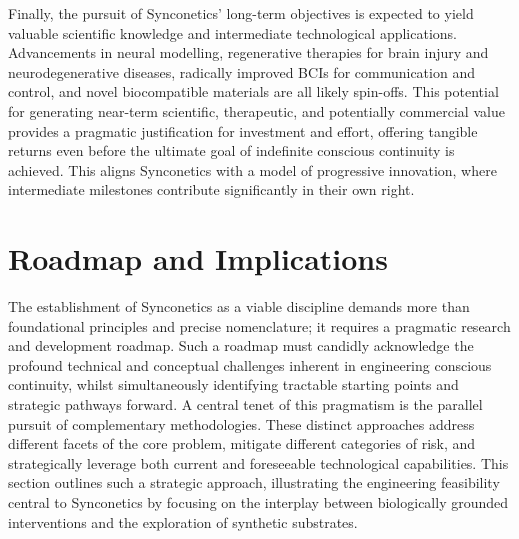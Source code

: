 \documentclass[10pt]{article}
\begin{document}
\begin{sloppypar}
  Finally, the pursuit of Synconetics’ long-term objectives is expected to yield valuable scientific knowledge and intermediate technological applications. Advancements in neural modelling, regenerative therapies for brain injury and neurodegenerative diseases, radically improved BCIs for communication and control, and novel biocompatible materials are all likely spin-offs. This potential for generating near-term scientific, therapeutic, and potentially commercial value provides a pragmatic justification for investment and effort, offering tangible returns even before the ultimate goal of indefinite conscious continuity is achieved. This aligns Synconetics with a model of progressive innovation, where intermediate milestones contribute significantly in their own right.



  \section{Roadmap and Implications}
  \label{sec:roadmap}


  The establishment of Synconetics as a viable discipline demands more than foundational principles and precise nomenclature; it requires a pragmatic research and development roadmap. Such a roadmap must candidly acknowledge the profound technical and conceptual challenges inherent in engineering conscious continuity, whilst simultaneously identifying tractable starting points and strategic pathways forward. A central tenet of this pragmatism is the parallel pursuit of complementary methodologies. These distinct approaches address different facets of the core problem, mitigate different categories of risk, and strategically leverage both current and foreseeable technological capabilities. This section outlines such a strategic approach, illustrating the engineering feasibility central to Synconetics by focusing on the interplay between biologically grounded interventions and the exploration of synthetic substrates.


\end{sloppypar}
\end{document}
